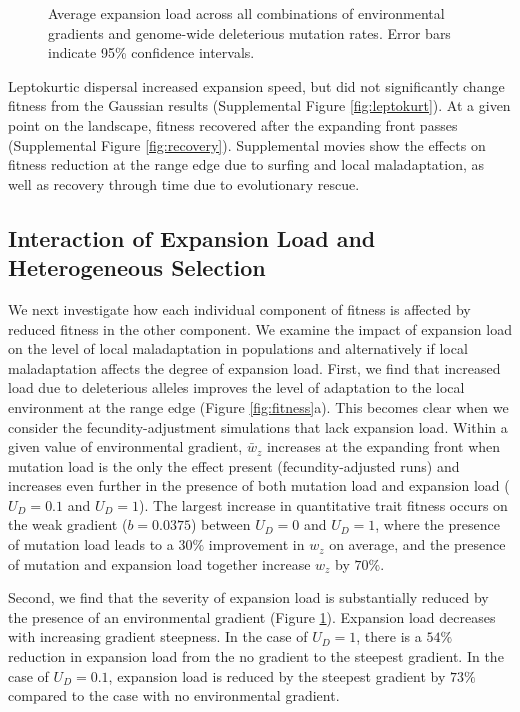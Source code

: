\begin{figure}[h]
\centering
{}
\caption[~- Average expansion load.]{Average expansion load across all combinations of environmental gradients and genome-wide deleterious mutation rates. Error bars indicate 95\% confidence intervals.}
\label{fig:load}
\end{figure}


Leptokurtic dispersal increased expansion speed, but did not significantly change fitness from the Gaussian results (Supplemental Figure \ref{fig:leptokurt}). At a given point on the landscape, fitness recovered after the expanding front passes (Supplemental Figure \ref{fig:recovery}). Supplemental movies show the effects on fitness reduction at the range edge due to surfing and local maladaptation, as well as recovery through time due to evolutionary rescue. 


\subsection{Interaction of Expansion Load and Heterogeneous Selection}

We next investigate how each individual component of fitness is affected by reduced fitness in the other component. We examine the impact of expansion load on the level of local maladaptation in populations and alternatively if local maladaptation affects the degree of expansion load. First, we find that increased load due to deleterious alleles improves the level of adaptation to the local environment at the range edge (Figure \ref{fig:fitness}a). This becomes clear when we consider the fecundity-adjustment simulations that lack expansion load. Within a given value of environmental gradient, $\bar{w}_z$ increases at the expanding front when mutation load is the only the effect present (fecundity-adjusted runs) and increases even further in the presence of both mutation load and expansion load  ($U_D = 0.1$ and $U_D = 1$). The largest increase in quantitative trait fitness occurs on the weak gradient ($b = 0.0375$) between $U_D = 0$ and $U_D = 1$, where the presence of mutation load leads to a $30\%$ improvement in $w_z$ on average, and the presence of mutation and expansion load together increase $w_z$ by $70\%$. 

Second, we find that the severity of expansion load is substantially reduced by the presence of an environmental gradient (Figure \ref{fig:load}). Expansion load decreases with increasing gradient steepness. In the case of $U_D = 1$, there is a $54\%$ reduction in expansion load from the no gradient to the steepest gradient. In the case of $U_D = 0.1$, expansion load is reduced by the steepest gradient by $73\%$ compared to the case with no environmental gradient. 



